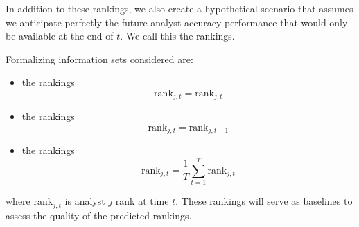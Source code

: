 \documentclass[12pt,a4paper]{article}\usepackage[]{graphicx}\usepackage[]{color}
\begin{document}
In addition to these rankings,  we also create a hypothetical scenario that assumes we anticipate perfectly the future analyst accuracy performance  that would only be available at the end of $t$.  
We call this the \tr{} rankings.

Formalizing information sets considered are:
\begin{itemize}
	\item  the \tr{} rankings%
	\begin{equation}
		\label{rank:true}
		\mathrm{rank}_{j,t}=\mathrm{rank}_{j,t}
	\end{equation}
	
	\item  the \naive{} rankings %
	\begin{equation}
		\label{rank:naive}
		\mathrm{rank}_{j,t}=\mathrm{rank}_{j,t-1}
	\end{equation}
	
	\item  the   rankings%
	\begin{equation}
		\label{rank:default}
		\mathrm{rank}_{j,t} = \frac{1}{T} \sum_{t=1}^{T} \mathrm{rank}_{j,t}
	\end{equation}
	
\end{itemize}
where $\mathrm{rank}_{j,t}$ is analyst $j$  rank at time $t$. These rankings will serve as  baselines to assess the quality of the predicted rankings.
\end{document}
